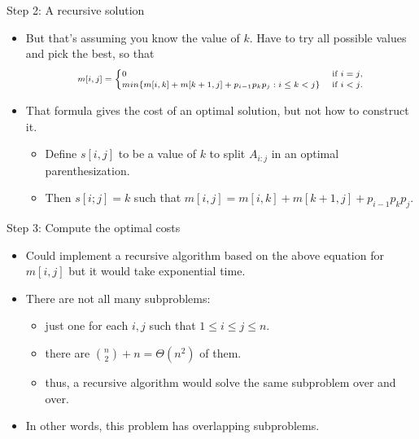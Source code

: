 \documentclass[aspectratio=169]{beamer}
\begin{document}
\begin{frame}{Step 2: A recursive solution}
    \begin{itemize}
        \item But that's assuming you know the value of $k$. Have to try all possible values and pick the best, so that
            \begin{equation*}
                \scriptsize
                \begin{align*}
                    m[i, j] =
                        \begin{cases}
                            0 & \text{ if } i = j \text{,} \\
                            min \{ m[i, k] + m[k+1, j] + p_{i-1} p_k p_j : i \leq k < j \} & \text{ if } i < j \text{.}
                        \end{cases}
                \end{align*}
            \end{equation*}
        \item That formula gives the cost of an optimal solution, but not how to construct it.
            \begin{itemize}
                \item Deﬁne $s[i, j]$ to be a value of $k$ to split $A_{i:j}$ in an optimal parenthesization.
                \item Then $s[i; j] = k$ such that $m[i, j] = m[i, k] + m[k+1, j] + p_{i-1} p_k p_j$.
            \end{itemize}
    \end{itemize}
\end{frame}

\begin{frame}{Step 3: Compute the optimal costs}
    \begin{itemize}
        \item Could implement a recursive algorithm based on the above equation for $m[i, j]$ but it would take exponential time.
        \item There are not all many subproblems:
            \begin{itemize}
                \item just one for each $i, j$ such that $1 \leq i \leq j \leq n$.
                \item there are ${n \choose 2} + n = \Theta (n^2)$ of them.
                \item thus, a recursive algorithm would solve the same subproblem over and over.
            \end{itemize}
        \item In other words, this problem has overlapping subproblems.
    \end{itemize}
\end{frame}
\end{document}
